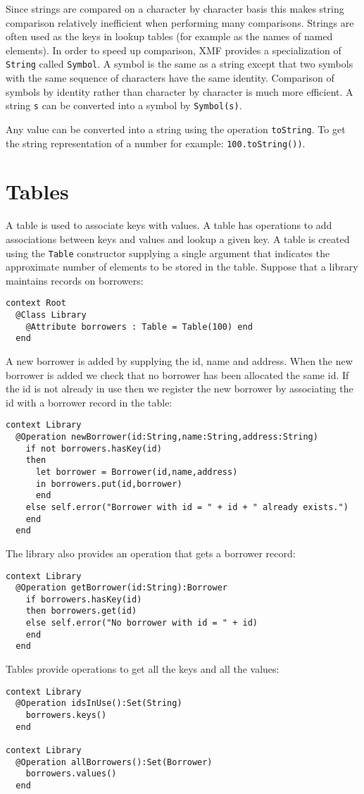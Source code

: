 \documentclass{article}
\begin{document}
Since strings are compared on a character by character basis this makes string comparison
relatively inefficient when performing many comparisons. Strings are often used as the
keys in lookup tables (for example as the names of named elements). In order to speed up
comparison, XMF provides a specialization of {\tt String} called {\tt Symbol}. A symbol is
the same as a string except that two symbols with the same sequence of characters have the
same identity. Comparison of symbols by identity rather than character by character is much
more efficient. A string {\tt s} can be converted into a symbol by {\tt Symbol(s)}.

Any value can be converted into a string using the operation {\tt toString}. To get the
string representation of a number for example: {\tt 100.toString())}.

\section{Tables}

A table is used to associate keys with values. A table has operations to add associations
between keys and values and lookup a given key. A table is created using the {\tt Table}
constructor supplying a single argument that indicates the approximate number of elements
to be stored in the table. Suppose that a library maintains records on borrowers:
\begin{verbatim}
context Root
  @Class Library
    @Attribute borrowers : Table = Table(100) end
  end
\end{verbatim}
A new borrower is added by supplying the id, name and address. When the new borrower is added
we check that no borrower has been allocated the same id. If the id is not already in use then
we register the new borrower by associating the id with a borrower record in the table:
\begin{verbatim}
context Library
  @Operation newBorrower(id:String,name:String,address:String)
    if not borrowers.hasKey(id)
    then
      let borrower = Borrower(id,name,address)
      in borrowers.put(id,borrower)
      end
    else self.error("Borrower with id = " + id + " already exists.")
    end
  end
\end{verbatim}
The library also provides an operation that gets a borrower record:
\begin{verbatim}
context Library
  @Operation getBorrower(id:String):Borrower
    if borrowers.hasKey(id)
    then borrowers.get(id)
    else self.error("No borrower with id = " + id)
    end
  end
\end{verbatim}
Tables provide operations to get all the keys and all the values:
\begin{verbatim}
context Library
  @Operation idsInUse():Set(String)
    borrowers.keys()
  end
  
context Library
  @Operation allBorrowers():Set(Borrower)
    borrowers.values()
  end
\end{verbatim}
\end{document}
